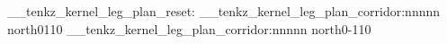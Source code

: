 \documentclass{standalone}
\begin{document}
\ExplSyntaxOn
\__tenkz_kernel_leg_plan_reset:
\__tenkz_kernel_leg_plan_corridor:nnnnn {north}{0}{1}{1}{0}
\__tenkz_kernel_leg_plan_corridor:nnnnn {north}{0}{-1}{1}{0}
\ExplSyntaxOff
\end{document}
